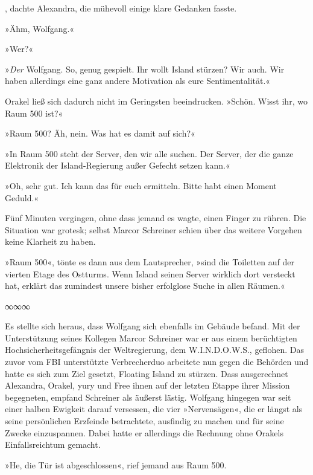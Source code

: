 , dachte Alexandra, die mühevoll einige klare Gedanken fasste. 

»Ähm, Wolfgang.«

»Wer?«

»\emph{Der} Wolfgang. So, genug gespielt. Ihr wollt Island stürzen? Wir auch. Wir haben allerdings eine ganz andere Motivation als eure Sentimentalität.«

Orakel ließ sich dadurch nicht im Geringsten beeindrucken. »Schön. Wisst ihr, wo Raum 500 ist?«

»Raum 500? Äh, nein. Was hat es damit auf sich?«

»In Raum 500 steht der Server, den wir alle suchen. Der Server, der die ganze Elektronik der Island-Regierung außer Gefecht setzen kann.«

»Oh, sehr gut. Ich kann das für euch ermitteln. Bitte habt einen Moment Geduld.«

Fünf Minuten vergingen, ohne dass jemand es wagte, einen Finger zu rühren. Die Situation war grotesk; selbst Marcor Schreiner schien über das weitere Vorgehen keine Klarheit zu haben.

»Raum 500«, tönte es dann aus dem Lautsprecher, »sind die Toiletten auf der vierten Etage des Ostturms. Wenn Island seinen Server wirklich dort versteckt hat, erklärt das zumindest unsere bisher erfolglose Suche in allen Räumen.«

\begin{center}
	∞∞∞
\end{center}

Es stellte sich heraus, dass Wolfgang sich ebenfalls im Gebäude befand. Mit der Unterstützung seines Kollegen Marcor Schreiner war er aus einem berüchtigten Hochsicherheitsgefängnis der Weltregierung, dem W.I.N.D.O.W.S., geflohen. Das zuvor vom FBI unterstützte Verbrecherduo arbeitete nun gegen die Behörden und hatte es sich zum Ziel gesetzt, Floating Island zu stürzen. Dass ausgerechnet Alexandra, Orakel, yury und Free ihnen auf der letzten Etappe ihrer Mission begegneten, empfand Schreiner als äußerst lästig. Wolfgang hingegen war seit einer halben Ewigkeit darauf versessen, die vier »Nervensägen«, die er längst als seine persönlichen Erzfeinde betrachtete, ausfindig zu machen und für seine Zwecke einzuspannen. Dabei hatte er allerdings die Rechnung ohne Orakels Einfallsreichtum gemacht.

»He, die Tür ist abgeschlossen«, rief jemand aus Raum 500.

